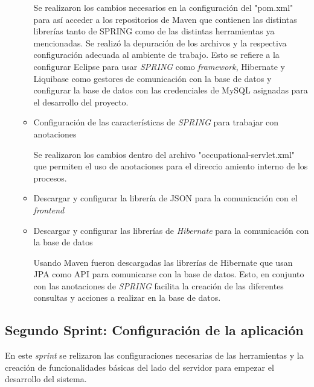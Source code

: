 \begin{enumerate}
\begin{itemize}
           Se realizaron los cambios necesarios en la configuración del "pom.xml" para así acceder a los repositorios de Maven que contienen las distintas librerías tanto de SPRING como de las distintas herramientas ya mencionadas. Se realizó la depuración de los archivos y la respectiva configuración adecuada al ambiente de trabajo. Esto se refiere a la configurar Eclipse para usar \textit{SPRING} como \textit{framework}, Hibernate y Liquibase como gestores de comunicación con la base de datos y configurar la base de datos con las credenciales de MySQL asignadas para el desarrollo del proyecto.
           
           \item Configuración de las características de \textit{SPRING} para trabajar con anotaciones
           
           Se realizaron los cambios dentro del archivo "occupational-servlet.xml" que permiten el uso de anotaciones para el direccio amiento interno de los procesos.
           
           
           \item Descargar y configurar la librería de JSON para la comunicación con el \textit{frontend}            
           
           
           \item Descargar y configurar las librerías de \textit{Hibernate} para la comunicación con la base de datos
           
           Usando Maven fueron descargadas las librerías de Hibernate que usan JPA como API para comunicarse con la base de datos. Esto, en conjunto con las anotaciones de \textit{SPRING} facilita la creación de las diferentes consultas y acciones a realizar en la base de datos.
        \end{itemize}
    \end{enumerate}
        
        
    \subsection{Segundo Sprint: Configuración de la aplicación}
    
    En este \textit{sprint} se relizaron las configuraciones necesarias de las herramientas y la creación de funcionalidades básicas del lado del servidor para empezar el desarrollo del sistema.
    
